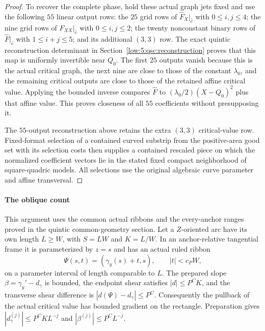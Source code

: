 \documentclass[11pt]{amsart}
\theoremstyle{definition}
\theoremstyle{remark}
\numberwithin{equation}{section}
\begin{document}
\begin{proof}
To recover the complete phase, hold these actual graph jets fixed and use the following $55$ linear output rows: the $25$ grid rows of $\widehat F_X|_{\widehat c}$ with $0\le i,j\le4$; the nine grid rows of $\widehat F_{XX}|_{\widehat c}$ with $0\le i,j\le2$; the twenty nonconstant binary rows of $\widehat F|_{\widehat c}$ with $1\le i+j\le5$; and its additional $(3,3)$ row. The exact quintic reconstruction determinant in Section~\ref{low:5:qsc:reconstruction} proves that this map is uniformly invertible near $Q_0$. The first $25$ outputs vanish because this is the actual critical graph, the next nine are close to those of the constant $\lambda_0$, and the remaining critical outputs are close to those of the retained affine critical value. Applying the bounded inverse compares $\widehat F$ to $(\lambda_0/2)(X-Q_0)^2$ plus that affine value. This proves closeness of all $55$ coefficients without presupposing it.

The $55$-output reconstruction above retains the extra $(3,3)$ critical-value row. Fixed-format selection of a contained curved substrip from the positive-area good set with its selection costs then supplies a contained rescaled piece on which the normalized coefficient vectors lie in the stated fixed compact neighborhood of square-quadric models. All selections use the original algebraic curve parameter and affine transversal.
\end{proof}

\paragraph{The oblique count}\label{low:5:qsc:paid-oblique-section}
This argument uses the common actual ribbons and the every-anchor ranges proved in the quintic common-geometry section. Let a $Z$-oriented arc have its own length $L\ge W$, with $S=LW$ and $K=L/W$. In an anchor-relative tangential frame it is parameterized by $z=s$ and has an actual ruled ribbon
\[
 \Psi(s,t)=(\gamma_y(s)+t,s),\qquad |t|<c_PW,
\]
on a parameter interval of length comparable to $L$. The prepared slope $\beta=\gamma_y'-d_\gamma$ is bounded, the endpoint shear satisfies $|d|\le P^CK$, and the transverse shear difference is $|d(\Psi)-d_\gamma|\le P^C$. Consequently the pullback of the actual critical value has bounded gradient on the rectangle. Preparation gives $|d_\gamma^{(j)}|\le P^CKL^{-j}$ and $|\beta^{(j)}|\le P^CL^{-j}$. 
\end{document}
